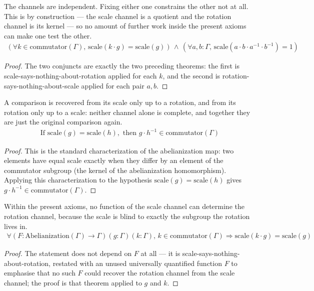 \begin{theorem}
The channels are independent.  Fixing either one constrains the other not at all.  This is by construction — the scale channel is a quotient and the rotation channel is its kernel — so no amount of further work inside the present axioms can make one test the other.
\begin{align*}
(\forall k \in \text{commutator}(\Gamma), \, \text{scale}(k \cdot g) = \text{scale}(g)) \,\wedge\, (\forall a, b : \Gamma, \, \text{scale}(a \cdot b \cdot a^{-1} \cdot b^{-1}) = 1)
\end{align*}
\begin{proof}
The two conjuncts are exactly the two preceding theorems: the first is scale-says-nothing-about-rotation applied for each $k$, and the second is rotation-says-nothing-about-scale applied for each pair $a,b$.
\end{proof}
\end{theorem}

\begin{theorem}
A comparison is recovered from its scale only up to a rotation, and from its rotation only up to a scale: neither channel alone is complete, and together they are just the original comparison again.
\begin{align*}
\text{If } \text{scale}(g) = \text{scale}(h), \text{ then } g \cdot h^{-1} \in \text{commutator}(\Gamma)
\end{align*}
\begin{proof}
This is the standard characterization of the abelianization map: two elements have equal scale exactly when they differ by an element of the commutator subgroup (the kernel of the abelianization homomorphism). Applying this characterization to the hypothesis $\text{scale}(g)=\text{scale}(h)$ gives $g\cdot h^{-1}\in\text{commutator}(\Gamma)$.
\end{proof}
\end{theorem}

\begin{theorem}
Within the present axioms, no function of the scale channel can determine the rotation channel, because the scale is blind to exactly the subgroup the rotation lives in.
\begin{align*}
\forall (F : \text{Abelianization}(\Gamma) \to \Gamma)(g : \Gamma)(k : \Gamma), \, k \in \text{commutator}(\Gamma) \Rightarrow \text{scale}(k \cdot g) = \text{scale}(g)
\end{align*}
\begin{proof}
The statement does not depend on $F$ at all — it is scale-says-nothing-about-rotation, restated with an unused universally quantified function $F$ to emphasise that no such $F$ could recover the rotation channel from the scale channel; the proof is that theorem applied to $g$ and $k$.
\end{proof}
\end{theorem}

